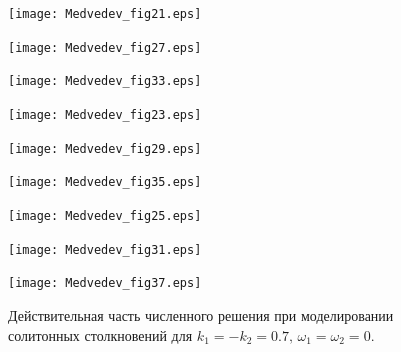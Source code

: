 \documentclass[12pt,a4paper]{article}
\begin{document}
	\begin{figure}[H]
		\begin{minipage}[h]{0.32\linewidth}
			\texttt{[image: Medvedev\_fig21.eps]}
		\end{minipage}
		\begin{minipage}[h]{0.32\linewidth}
			\texttt{[image: Medvedev\_fig27.eps]}
		\end{minipage}
		\begin{minipage}[h]{0.32\linewidth}
			\texttt{[image: Medvedev\_fig33.eps]}
		\end{minipage}

		\begin{minipage}[h]{0.32\linewidth}
			\texttt{[image: Medvedev\_fig23.eps]}
		\end{minipage}
		\begin{minipage}[h]{0.32\linewidth}
			\texttt{[image: Medvedev\_fig29.eps]}
		\end{minipage}
		\begin{minipage}[h]{0.32\linewidth}
			\texttt{[image: Medvedev\_fig35.eps]}
		\end{minipage}

		\begin{minipage}[h]{0.32\linewidth}
			\texttt{[image: Medvedev\_fig25.eps]}
		\end{minipage}
		\begin{minipage}[h]{0.32\linewidth}
			\texttt{[image: Medvedev\_fig31.eps]}
		\end{minipage}
		\begin{minipage}[h]{0.32\linewidth}
			\texttt{[image: Medvedev\_fig37.eps]}
		\end{minipage}
		\caption{Действительная часть численного решения при моделировании солитонных столкновений для \(k_{1}=-k_{2}=0.7,\,\omega_{1}=\omega_{2}=0\).}
		\label{fig51}
	\end{figure}
\end{document}
